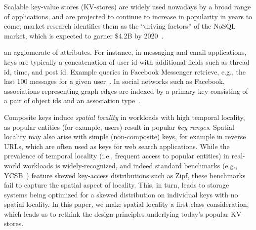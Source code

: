 


Scalable key-value stores (KV-stores) are widely used nowadays by a broad range of applications, and are projected
to continue to increase in popularity in years to come; market research  identifies them as the 
``driving factors'' of the NoSQL market, which is expected to garner \$4.2B by 2020~\cite{alliedmarketresearch}.

{} an agglomerate of attributes. {}  
For instance,  in messaging and email applications, keys are typically a concatenation of user id with additional fields 
such as thread id, time, and post id. Example queries in Facebook Messenger retrieve, e.g., the last 100 messages for a 
given user~\cite{Borthakur:2011:AHG:1989323.1989438}. %
In social networks such as Facebook, associations representing graph edges are indexed by a primary key consisting of a 
pair of object ids and an association type~\cite{Armstrong:2013:LDB:2463676.2465296}.
{}

Composite keys induce \emph{spatial locality} in workloads with high {temporal locality}, as 
popular entities (for example, users) result in popular \emph{key ranges}. 
Spatial locality may also arise with simple (non-composite) keys, for example in 
 reverse  URLs, which  are often used as keys for web search applications. 
While the prevalence of temporal locality (i.e., frequent access to popular entities) in real-world workloads is widely-recognized, 
and indeed standard benchmarks (e.g., YCSB~\cite{YCSB})  feature skewed key-access distributions such as Zipf, 
these benchmarks fail to capture the spatial aspect of locality.
This, in turn, leads to storage systems being optimized for a skewed distribution on individual keys with no spatial locality.
In this paper, we make spatial locality a first class  consideration, which 
leads us to rethink the design principles underlying today's popular KV-stores.

